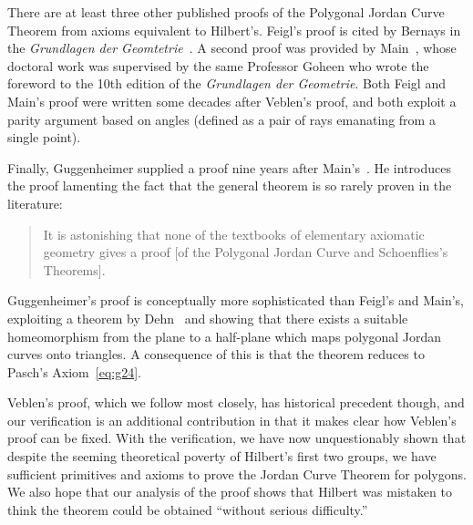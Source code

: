 There are at least three other published proofs of the Polygonal Jordan Curve Theorem from axioms equivalent to Hilbert's. Feigl's proof is cited by Bernays in the \emph{Grundlagen der Geomtetrie}~\cite{FeiglJordan}. A second proof was provided by Main~\cite{MainHilbertGeometry}, whose doctoral work was supervised by the same Professor Goheen who wrote the foreword to the 10th edition of the \emph{Grundlagen der Geometrie}. Both Feigl and Main's proof were written some decades after Veblen's proof, and both exploit a parity argument based on angles (defined as a pair of rays emanating from a single point). 

Finally, Guggenheimer supplied a proof nine years after Main's~\cite{GuggenheimerJordanProof}. He introduces the proof lamenting the fact that the general theorem is so rarely proven in the literature:
\begin{quotation}It is astonishing that none of the textbooks of elementary axiomatic geometry gives a proof [of the Polygonal Jordan Curve and Schoenflies's Theorems].
\end{quotation}
Guggenheimer's proof is conceptually more sophisticated than Feigl's and Main's, exploiting a theorem by Dehn~\cite{GuggenheimerJordanCurve} and showing that there exists a suitable homeomorphism from the plane to a half-plane which maps polygonal Jordan curves onto triangles. A consequence of this is that the theorem reduces to Pasch's Axiom~\ref{eq:g24}.

Veblen's proof, which we follow most closely, has historical precedent though, and our verification is an additional contribution in that it makes clear how Veblen's proof can be fixed. With the verification, we have now unquestionably shown that despite the seeming theoretical poverty of Hilbert's first two groups, we have sufficient primitives and axioms to prove the Jordan Curve Theorem for polygons. We also hope that our analysis of the proof shows that Hilbert was mistaken to think the theorem could be obtained ``without serious difficulty.''

